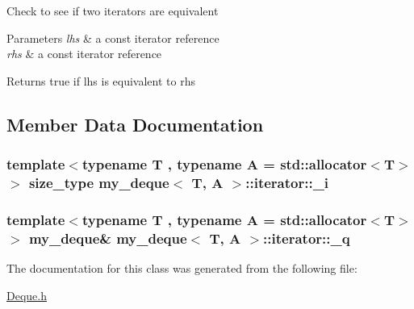 Check to see if two iterators are equivalent 
\begin{DoxyParams}{Parameters}
{\em lhs} & a const iterator reference \\
\hline
{\em rhs} & a const iterator reference \\
\hline
\end{DoxyParams}
\begin{DoxyReturn}{Returns}
true if lhs is equivalent to rhs 
\end{DoxyReturn}


\subsection{Member Data Documentation}
\hypertarget{classmy__deque_1_1iterator_ac5b4cfa68ec2b6cee397e3b4941cdeef}{
\subsubsection[{\-\_\-i}]{\setlength{\rightskip}{0pt plus 5cm}template$<$typename T , typename A  = std\-::allocator$<$\-T$>$$>$ {\bf size\-\_\-type} {\bf my\-\_\-deque}$<$ T, A $>$\-::iterator\-::\-\_\-i\hspace{0.3cm}{\ttfamily [private]}}}\label{classmy__deque_1_1iterator_ac5b4cfa68ec2b6cee397e3b4941cdeef}
\hypertarget{classmy__deque_1_1iterator_ad9afe5fa6123a2b3a07e640b248ec097}{
\subsubsection[{\-\_\-q}]{\setlength{\rightskip}{0pt plus 5cm}template$<$typename T , typename A  = std\-::allocator$<$\-T$>$$>$ {\bf my\-\_\-deque}\& {\bf my\-\_\-deque}$<$ T, A $>$\-::iterator\-::\-\_\-q\hspace{0.3cm}{\ttfamily [private]}}}\label{classmy__deque_1_1iterator_ad9afe5fa6123a2b3a07e640b248ec097}


The documentation for this class was generated from the following file\-:\begin{DoxyCompactItemize}
\item 
\hyperlink{Deque_8h}{Deque.\-h}\end{DoxyCompactItemize}
